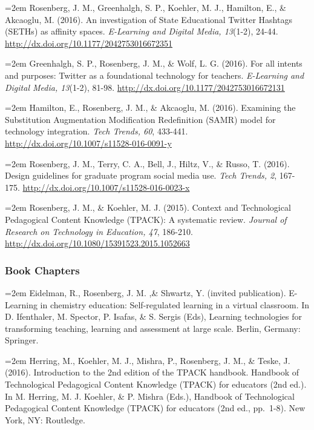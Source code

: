 \documentclass[]{article}
\begin{document}
\hangindent=2em Rosenberg, J. M., Greenhalgh, S. P., Koehler, M. J.,
Hamilton, E., \& Akcaoglu, M. (2016). An investigation of State
Educational Twitter Hashtags (SETHs) as affinity spaces.
\emph{E-Learning and Digital Media, 13}(1-2), 24-44.
\url{http://dx.doi.org/10.1177/2042753016672351}

\hangindent=2em Greenhalgh, S. P., Rosenberg, J. M., \& Wolf, L. G.
(2016). For all intents and purposes: Twitter as a foundational
technology for teachers. \emph{E-Learning and Digital Media, 13}(1-2),
81-98. \url{http://dx.doi.org/10.1177/2042753016672131}

\hangindent=2em Hamilton, E., Rosenberg, J. M., \& Akcaoglu, M. (2016).
Examining the Substitution Augmentation Modification Redefinition (SAMR)
model for technology integration. \emph{Tech Trends, 60}, 433-441.
\url{http://dx.doi.org/10.1007/s11528-016-0091-y}

\hangindent=2em Rosenberg, J. M., Terry, C. A., Bell, J., Hiltz, V., \&
Russo, T. (2016). Design guidelines for graduate program social media
use. \emph{Tech Trends, 2}, 167-175.
\url{http://dx.doi.org/10.1007/s11528-016-0023-x}

\hangindent=2em Rosenberg, J. M., \& Koehler, M. J. (2015). Context and
Technological Pedagogical Content Knowledge (TPACK): A systematic
review. \emph{Journal of Research on Technology in Education, 47},
186-210. \url{http://dx.doi.org/10.1080/15391523.2015.1052663}

\hypertarget{book-chapters}{%
\subsubsection{Book Chapters}\label{book-chapters}}

\hangindent=2em Eidelman, R., Rosenberg, J. M. ,\& Shwartz, Y. (invited
publication). E-Learning in chemistry education: Self-regulated learning
in a virtual classroom. In D. Ifenthaler, M. Spector, P. Isafas, \& S.
Sergis (Eds), Learning technologies for transforming teaching, learning
and assessment at large scale. Berlin, Germany: Springer.

\hangindent=2em Herring, M., Koehler, M. J., Mishra, P., Rosenberg, J.
M., \& Teske, J. (2016). Introduction to the 2nd edition of the TPACK
handbook. Handbook of Technological Pedagogical Content Knowledge
(TPACK) for educators (2nd ed.). In M. Herring, M. J. Koehler, \& P.
Mishra (Eds.), Handbook of Technological Pedagogical Content Knowledge
(TPACK) for educators (2nd ed., pp.~1-8). New York, NY: Routledge.
\end{document}
